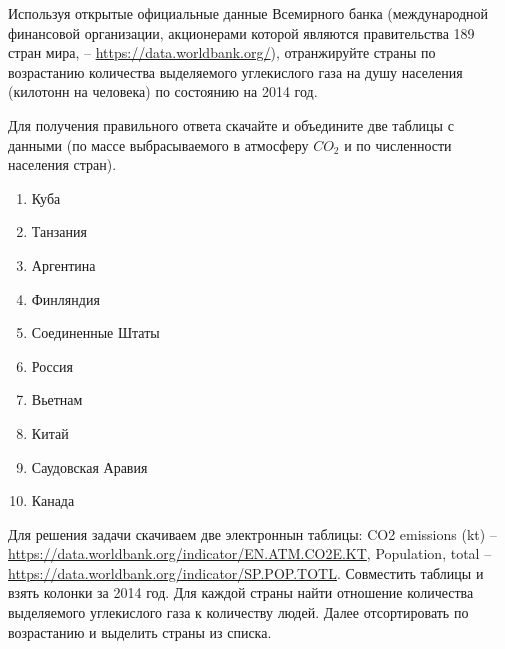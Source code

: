 
Используя открытые официальные данные Всемирного банка (международной финансовой организации, акционерами которой являются правительства 189 стран мира, – \url{https://data.worldbank.org/}),  отранжируйте страны по возрастанию количества выделяемого углекислого газа на душу 
населения (килотонн на человека) по состоянию на 2014 год.

Для получения правильного ответа скачайте и объедините две таблицы с данными (по массе выбрасываемого в атмосферу $CO_2$ и по численности населения стран).

\begin{enumerate}
    \item Куба
    \item Танзания
    \item Аргентина
    \item Финляндия
    \item Соединенные Штаты
    \item Россия
    \item Вьетнам
    \item Китай
    \item Саудовская Аравия
    \item Канада
\end{enumerate}

\solutionSection

Для решения задачи скачиваем две электроннын таблицы: CO2 emissions (kt) -- \url{https://data.worldbank.org/indicator/EN.ATM.CO2E.KT}, Population, total -- \url{https://data.worldbank.org/indicator/SP.POP.TOTL}. Совместить таблицы и взять колонки за 2014 год. Для каждой страны найти отношение количества выделяемого углекислого газа к количеству людей. Далее отсортировать по возрастанию и выделить страны из списка. 

